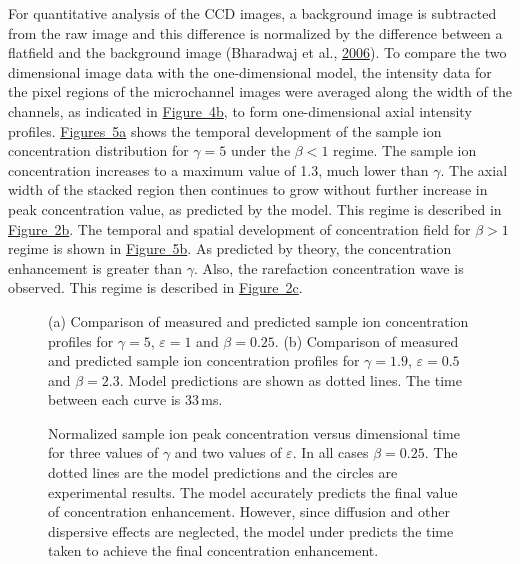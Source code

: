 \documentclass[lineno,authoryear]{FLO_v1}%
\theoremstyle{definition}
\begin{document}
For quantitative analysis of the CCD images, a background
image is subtracted from the raw image and this difference
is normalized by the difference between a flatfield and the
background image (Bharadwaj et al., \hyperlink{bib1}{2006}). To compare the two dimensional
image data with the one-dimensional model, the intensity
data for the pixel regions of the microchannel images were
averaged along the width of the channels, as indicated in
\hyperref[fig4]{Figure~4b}, to form one-dimensional axial
intensity profiles. \hyperref[fig5]{Figures~5a} shows the
temporal development of the sample ion concentration
distribution for $\gamma =5$ under the $\beta <1$ regime.
The sample ion concentration increases to a maximum value
of 1.3, much lower than $\gamma$. The axial width of the
stacked region then continues to grow without further
increase in peak concentration value, as predicted by the
model. This regime is described in
\hyperref[fig2]{Figure~2b}. The temporal and spatial
development of concentration field for $\beta>1$ regime is
shown in \hyperref[fig5]{Figure~5b}. As predicted by
theory, the concentration enhancement is greater than
$\gamma$. Also, the rarefaction concentration wave is
observed. This regime is described in
\hyperref[fig2]{Figure~2c}.

\begin{figure}[]
\caption{(a) Comparison of measured and predicted sample ion
concentration profiles for $\gamma=5$, $\varepsilon=1$
and $\beta=0.25$. (b) Comparison of measured and
predicted sample ion concentration profiles for
$\gamma=1.9$, $\varepsilon=0.5$ and $\beta=2.3$.
Model predictions are shown as dotted lines. The
time between each curve is 33\,ms.\label{fig5}}
\end{figure}

\begin{figure}[]
\caption{Normalized sample ion peak concentration versus dimensional
time for three values of $\gamma$ and two values of
$\varepsilon$. In all cases $\beta=0.25$. The
dotted lines are the model predictions and the circles are
experimental results. The model accurately predicts the
final value of concentration enhancement. However, since
diffusion and other dispersive effects are neglected, the
model under predicts the time taken to achieve the final
concentration enhancement.\label{fig6}}
\end{figure}
\end{document}
